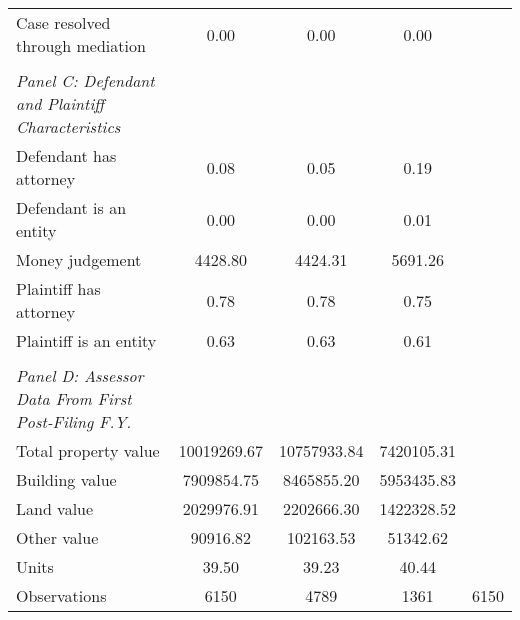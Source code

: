 {\begin{tabular}{l*{4}{c}}
\hspace{0.25cm}Case resolved through mediation&        0.00&        0.00&        0.00&            \\
\vspace{0.1em} \\ \emph{Panel C: Defendant and Plaintiff Characteristics}&            &            &            &            \\
\hspace{0.25cm}Defendant has attorney&        0.08&        0.05&        0.19&            \\
\hspace{0.25cm}Defendant is an entity&        0.00&        0.00&        0.01&            \\
\hspace{0.25cm}Money judgement&     4428.80&     4424.31&     5691.26&            \\
\hspace{0.25cm}Plaintiff has attorney&        0.78&        0.78&        0.75&            \\
\hspace{0.25cm}Plaintiff is an entity&        0.63&        0.63&        0.61&            \\
\vspace{0.1em} \\ \emph{Panel D: Assessor Data From First Post-Filing F.Y.}&            &            &            &            \\
\hspace{0.25cm}Total property value& 10019269.67& 10757933.84&  7420105.31&            \\
\hspace{0.25cm}Building value&  7909854.75&  8465855.20&  5953435.83&            \\
\hspace{0.25cm}Land value&  2029976.91&  2202666.30&  1422328.52&            \\
\hspace{0.25cm}Other value&    90916.82&   102163.53&    51342.62&            \\
\hspace{0.25cm}Units&       39.50&       39.23&       40.44&            \\
\midrule
Observations        &        6150&        4789&        1361&        6150\\
\bottomrule
\end{tabular}
}

